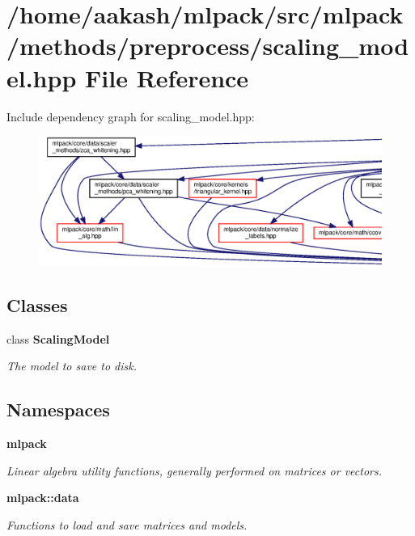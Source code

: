 \section{/home/aakash/mlpack/src/mlpack/methods/preprocess/scaling\+\_\+model.hpp File Reference}
\label{scaling__model_8hpp}
Include dependency graph for scaling\+\_\+model.\+hpp\+:
\nopagebreak
\begin{figure}[H]
\begin{center}
\leavevmode
\includegraphics[width=350pt]{scaling__model_8hpp__incl}
\end{center}
\end{figure}
\subsection*{Classes}
\begin{DoxyCompactItemize}
\item 
class \textbf{ Scaling\+Model}
\begin{DoxyCompactList}\small\item\em The model to save to disk. \end{DoxyCompactList}\end{DoxyCompactItemize}
\subsection*{Namespaces}
\begin{DoxyCompactItemize}
\item 
 \textbf{ mlpack}
\begin{DoxyCompactList}\small\item\em Linear algebra utility functions, generally performed on matrices or vectors. \end{DoxyCompactList}\item 
 \textbf{ mlpack\+::data}
\begin{DoxyCompactList}\small\item\em Functions to load and save matrices and models. \end{DoxyCompactList}\end{DoxyCompactItemize}


